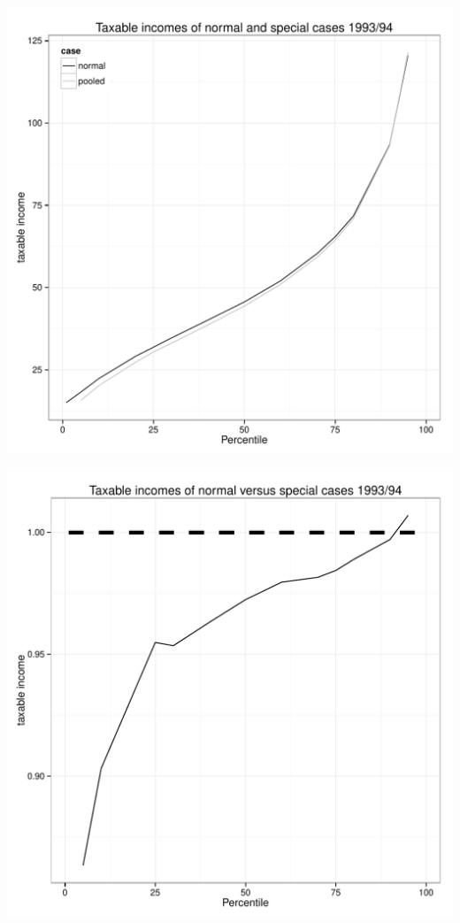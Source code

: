 \documentclass[twoside]{article}\usepackage[]{graphicx}\usepackage[]{color}
\makeatletter
\def\maxwidth{ %
  \ifdim\Gin@nat@width>\linewidth
    \linewidth
  \else
    \Gin@nat@width
  \fi
}
\newenvironment{knitrout}{}{} %
\makeatother
\begin{document}
\begin{multicols}{2}
\begin{knitrout}
\color{fgcolor}
\includegraphics[width=\maxwidth]{figure/specialcases93941} 

\includegraphics[width=\maxwidth]{figure/specialcases93942} 


\end{knitrout}
\end{multicols}
\end{document}
